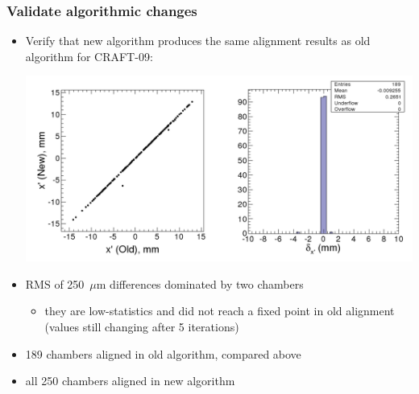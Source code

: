 \documentclass[compress]{beamer}
\begin{document}
\begin{frame}
\frametitle{Validate algorithmic changes}

\begin{itemize}
\item Verify that new algorithm produces the same alignment results as old algorithm for CRAFT-09:

\includegraphics[width=0.95\linewidth]{old-new-validation.png}

\item RMS of 250~$\mu$m differences dominated by two chambers
\begin{itemize}
\item they are low-statistics and did not reach a fixed point in old alignment (values still changing after 5 iterations)
\end{itemize}

\item 189 chambers aligned in old algorithm, compared above

\item all 250 chambers aligned in new algorithm
\end{itemize}
\end{frame}
\end{document}
